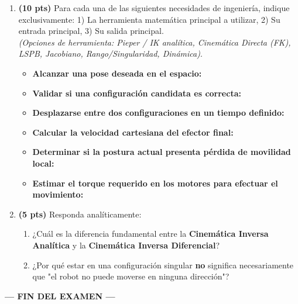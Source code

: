 \documentclass[11pt, a4paper]{article}
\begin{document}
\begin{enumerate}[label=\textbf{\alph*)}]
    \item \textbf{(10 pts)} Para cada una de las siguientes necesidades de ingeniería, indique exclusivamente: 1) La herramienta matemática principal a utilizar, 2) Su entrada principal, 3) Su salida principal. \\
    \textit{(Opciones de herramienta: Pieper / IK analítica, Cinemática Directa (FK), LSPB, Jacobiano, Rango/Singularidad, Dinámica)}.
    
    \begin{itemize}
        \item \textbf{Alcanzar una pose deseada en el espacio:}
        \item \textbf{Validar si una configuración candidata es correcta:}
        \item \textbf{Desplazarse entre dos configuraciones en un tiempo definido:}
        \item \textbf{Calcular la velocidad cartesiana del efector final:}
        \item \textbf{Determinar si la postura actual presenta pérdida de movilidad local:}
        \item \textbf{Estimar el torque requerido en los motores para efectuar el movimiento:}
    \end{itemize}

    \item \textbf{(5 pts)} Responda analíticamente:
    \begin{enumerate}[label=\arabic*.]
        \item ¿Cuál es la diferencia fundamental entre la \textbf{Cinemática Inversa Analítica} y la \textbf{Cinemática Inversa Diferencial}?
        \item ¿Por qué estar en una configuración singular \textbf{no} significa necesariamente que "el robot no puede moverse en ninguna dirección"?
    \end{enumerate}
\end{enumerate}

\begin{center}
    \textbf{--- FIN DEL EXAMEN ---}
\end{center}
\end{document}
